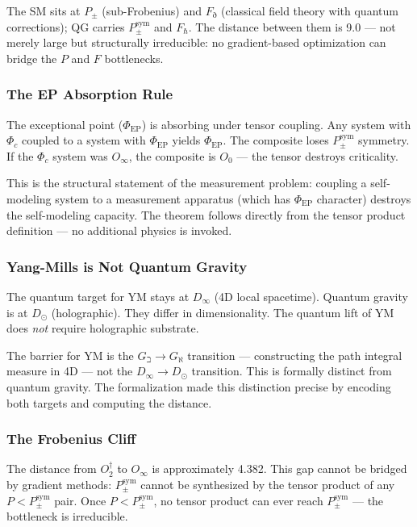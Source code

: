 \documentclass[12pt,a4paper]{article}
\begin{document}
The SM sits at $P_{\pm}$ (sub-Frobenius) and $F_{\eth}$ (classical field theory with quantum corrections); QG carries $P_{\pm}^{\text{sym}}$ and $F_{\hbar}$. The distance between them is 9.0 --- not merely large but structurally irreducible: no gradient-based optimization can bridge the $P$ and $F$ bottlenecks.

\subsubsection{The EP Absorption Rule}

The exceptional point ($\Phi_\text{EP}$) is absorbing under tensor coupling. Any system with $\Phi_c$ coupled to a system with $\Phi_\text{EP}$ yields $\Phi_\text{EP}$. The composite loses $P_{\pm}^{\text{sym}}$ symmetry. If the $\Phi_c$ system was $O_{\infty}$, the composite is $O_0$ --- the tensor destroys criticality.

This is the structural statement of the measurement problem: coupling a self-modeling system to a measurement apparatus (which has $\Phi_\text{EP}$ character) destroys the self-modeling capacity. The theorem follows directly from the tensor product definition --- no additional physics is invoked.

\subsubsection{Yang-Mills is Not Quantum Gravity}

The quantum target for YM stays at $D_{\infty}$ (4D local spacetime). Quantum gravity is at $D_{\odot}$ (holographic). They differ in dimensionality. The quantum lift of YM does \emph{not} require holographic substrate.

The barrier for YM is the $G_{\beth} \to G_{\aleph}$ transition --- constructing the path integral measure in 4D --- not the $D_{\infty} \to D_{\odot}$ transition. This is formally distinct from quantum gravity. The formalization made this distinction precise by encoding both targets and computing the distance.

\subsubsection{The Frobenius Cliff}

The distance from $O_2^\dagger$ to $O_{\infty}$ is approximately 4.382. This gap cannot be bridged by gradient methods: $P_{\pm}^{\text{sym}}$ cannot be synthesized by the tensor product of any $P < P_{\pm}^{\text{sym}}$ pair. Once $P < P_{\pm}^{\text{sym}}$, no tensor product can ever reach $P_{\pm}^{\text{sym}}$ --- the bottleneck is irreducible.
\end{document}
